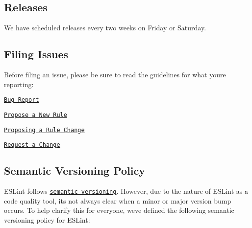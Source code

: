 \subsection*{Releases}

We have scheduled releases every two weeks on Friday or Saturday.

\subsection*{Filing Issues}

Before filing an issue, please be sure to read the guidelines for what you\textquotesingle{}re reporting\+:


\begin{DoxyItemize}
\item \href{http://eslint.org/docs/developer-guide/contributing/reporting-bugs}{\tt Bug Report}
\item \href{http://eslint.org/docs/developer-guide/contributing/new-rules}{\tt Propose a New Rule}
\item \href{http://eslint.org/docs/developer-guide/contributing/rule-changes}{\tt Proposing a Rule Change}
\item \href{http://eslint.org/docs/developer-guide/contributing/changes}{\tt Request a Change}
\end{DoxyItemize}

\subsection*{Semantic Versioning Policy}

E\+S\+Lint follows \href{http://semver.org}{\tt semantic versioning}. However, due to the nature of E\+S\+Lint as a code quality tool, it\textquotesingle{}s not always clear when a minor or major version bump occurs. To help clarify this for everyone, we\textquotesingle{}ve defined the following semantic versioning policy for E\+S\+Lint\+:


